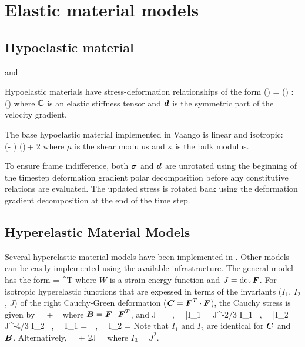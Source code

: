 \chapter{Elastic material models}
\section{Hypoelastic material}
  and  \MPM

Hypoelastic materials have stress-deformation relationships of the form
\Beq
  \dot{\Bsig}(\BF) = \SfC(\BF) : \BdT(\BF)
\Eeq
where $\boldsymbol{\mathbb{C}}$ is an elastic stiffness tensor and $\boldsymbol{d}$ is the symmetric
part of the velocity gradient.

The base hypoelastic material implemented in Vaango is linear and isotropic:
\Beq
  \dot{\Bsig} = \left(\kappa - \mu\right) \Tr(\BdT)\,\BI + 2\mu \BdT
\Eeq
where $\mu$ is the shear modulus and $\kappa$ is the bulk modulus.

\begin{NoteBox}
  To ensure frame indifference, both $\boldsymbol{\sigma}$ and $\boldsymbol{d}$ are unrotated 
  using the beginning of the timestep deformation gradient polar decomposition before any
  constitutive relations are evaluated.  The updated stress is rotated back using the deformation 
  gradient decomposition at the end of the time step.
\end{NoteBox}

\section{Hyperelastic Material Models}
Several hyperelastic material models have been implemented in \Vaango.  Other models
can be easily implemented using the available infrastructure.  The general
model has the form
\Beq
  \Bsig =   \cdot\BF^T
\Eeq
where $W$ is a strain energy function and $J = \det\boldsymbol{F}$.  
For isotropic hyperelastic functions that
are expessed in terms of the invariants ($I_1$, $I_2$, $J$) of the right Cauchy-Green deformation 
($\boldsymbol{C} = \boldsymbol{F}^T\cdot\boldsymbol{F}$), the Cauchy stress is given by
\Beq
  \Bsig =   + ~\BI
\Eeq
where $\boldsymbol{B} = \boldsymbol{F}\cdot\boldsymbol{F}^T$, and
\Beq
  J = \det\BF ~,~~ \bar{I}_1 = J^{-2/3} I_1 ~,~~ \bar{I}_2 = J^{-4/3} I_2 ~,~~
  I_1 = \Tr\,\BC ~,~~ I_2 = \Half{}
\Eeq
Note that $I_1$ and $I_2$ are identical for $\boldsymbol{C}$ and $\boldsymbol{B}$. Alternatively,
\Beq
  \Bsig  =  + 
           2J~~\BI
\Eeq
where $I_3 = J^2$.

